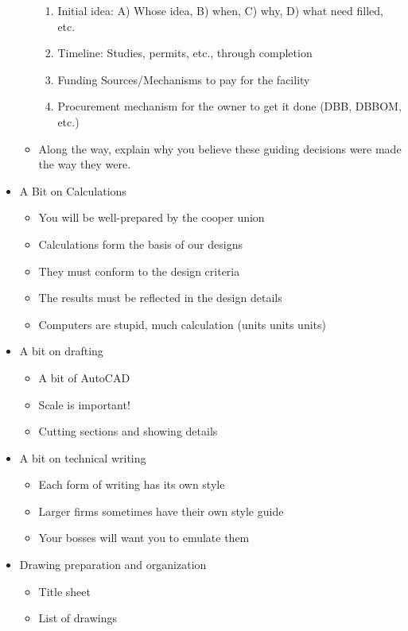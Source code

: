 \documentclass{article}
\begin{document}
\begin{itemize}
\begin{itemize}
\begin{enumerate}
            \item Initial idea: A) Whose idea, B) when, C) why, D) what need filled, etc.
            \item Timeline: Studies, permits, etc., through completion
            \item Funding Sources/Mechanisms to pay for the facility
            \item Procurement mechanism for the owner to get it done (DBB, DBBOM, etc.)
        \end{enumerate}
        \item Along the way, explain why you believe these guiding decisions were made the way they were.
    \end{itemize}
    \item A Bit on Calculations
    \begin{itemize}
        \item You will be well-prepared by the cooper union
        \item Calculations form the basis of our designs
        \item They must conform to the design criteria
        \item The results must be reflected in the design details
        \item Computers are stupid, much calculation (units units units)
    \end{itemize}
    \item A bit on drafting
    \begin{itemize}
        \item A bit of AutoCAD
        \item Scale is important!
        \item Cutting sections and showing details
    \end{itemize}
    \item A bit on technical writing
    \begin{itemize}
        \item Each form of writing has its own style
        \item Larger firms sometimes have their own style guide
        \item Your bosses will want you to emulate them
    \end{itemize}
    \item Drawing preparation and organization
    \begin{itemize}
        \item Title sheet
        \item List of drawings

\end{itemize}
\end{itemize}
\end{document}
